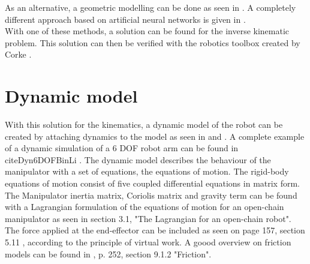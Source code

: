 As an alternative, a geometric modelling can be done as seen in %
\cite{geomModelingKamel}. 
A completely different approach based on artificial neural networks is given in %
\cite{invKinANNKSHITISH}.\\
%
%
With one of these methods, a solution can be found for the inverse kinematic problem.
This solution can then be verified with the robotics toolbox created by Corke \cite{CorkeRoboticsToolbox}.

\section{Dynamic model}

With this solution for the kinematics, a dynamic model of the robot can be created by attaching dynamics to the model as seen in %
\cite{KongWei} and %
\cite{MathIntroRobManip}. A complete example of a dynamic simulation of a 6 \ac{DOF} robot arm can be found in %
cite{Dyn6DOFBinLi}
\cite{CorkeRoboticVisionControl}.
The dynamic model describes the behaviour of the manipulator with a set of equations, the equations of motion.
The rigid-body equations of motion consist of five coupled differential equations in matrix form.
The Manipulator inertia matrix, Coriolis matrix and gravity term can be found with a Lagrangian formulation of the equations of motion for an open-chain manipulator as seen in %
\cite{MathIntroRobManip} section 3.1, "The Lagrangian for an open-chain robot". The force applied at the end-effector can be included as seen on page 157, section 5.11 \cite{IndustrialRobotArm}, according to the principle of virtual work. A goood overview on friction models can be found in \cite{CorkeRoboticVisionControl}, p. 252, section 9.1.2 "Friction". 

